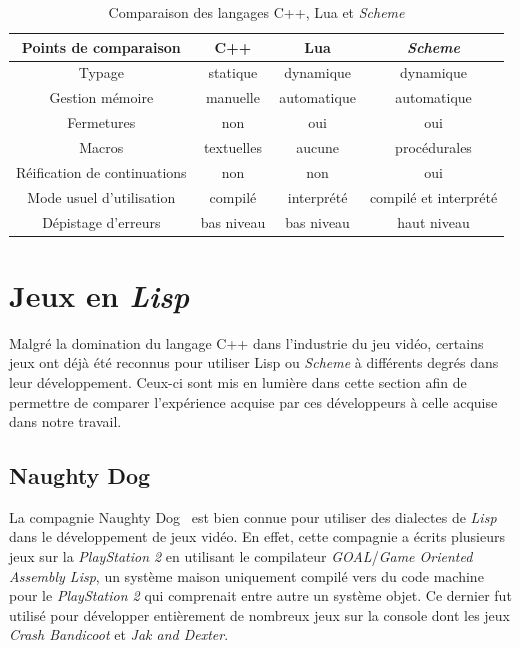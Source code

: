 \documentclass[12pt,twoside,letterpaper,francais]{book}
\newcommand{\lisp}{{\textit{Lisp }}}
\newcommand{\Schemelang}{{\textit{Scheme }}}
\begin{document}
\begin{table}
\begin{tabular}{cccc}
Points de comparaison         & C++ & Lua & \Schemelang\\
\hline \hline
Typage                       & statique & dynamique & dynamique\\
Gestion mémoire              & manuelle & automatique & automatique\\
Fermetures                   & non & oui & oui\\
Macros                       & textuelles & aucune & procédurales\\
Réification de continuations & non & non & oui\\
Mode usuel d'utilisation     & compilé & interprété & compilé et interprété\\
Dépistage d'erreurs          & bas niveau & bas niveau & haut niveau\\
\hline
\end{tabular}
\caption{Comparaison des langages C++, Lua et \Schemelang}
\label{Rev:lang-comp}
\end{table}


\FloatBarrier
\section{Jeux en \lisp}
Malgré la domination du langage C++ dans l'industrie du jeu vidéo,
certains jeux ont déjà été reconnus pour utiliser Lisp ou \Schemelang à
différents degrés dans leur développement. Ceux-ci sont mis en lumière
dans cette section afin de permettre de comparer l'expérience acquise
par ces développeurs à celle acquise dans notre travail.


\FloatBarrier
\subsection{Naughty Dog}
La compagnie Naughty Dog~\cite{ND} est bien connue pour utiliser des
dialectes de \lisp dans le développement de jeux vidéo. En effet,
cette compagnie a écrits plusieurs jeux sur la \textit{PlayStation 2}
en utilisant le compilateur \textit{GOAL}/\textit{Game Oriented
  Assembly Lisp}, un système maison uniquement compilé vers du code
machine pour le \textit{PlayStation 2} qui comprenait entre autre un
système objet. Ce dernier fut utilisé pour développer entièrement de
nombreux jeux sur la console dont les jeux \textit{Crash Bandicoot} et
\textit{Jak and Dexter}.
\end{document}
